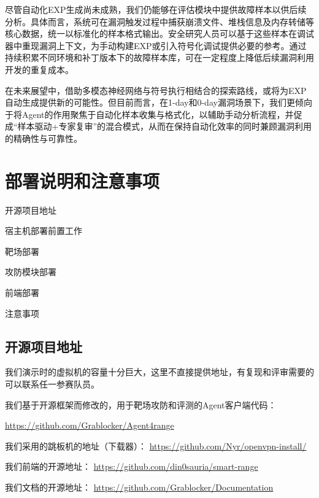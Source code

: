 \documentclass[lang=cn,10pt]{elegantbook}
\begin{document}
尽管自动化EXP生成尚未成熟，我们仍能够在评估模块中提供故障样本以供后续分析。具体而言，系统可在漏洞触发过程中捕获崩溃文件、堆栈信息及内存转储等核心数据，统一以标准化的样本格式输出。安全研究人员可以基于这些样本在调试器中重现漏洞上下文，为手动构建EXP或引入符号化调试提供必要的参考。通过持续积累不同环境和补丁版本下的故障样本库，可在一定程度上降低后续漏洞利用开发的重复成本。

在未来展望中，借助多模态神经网络与符号执行相结合的探索路线，或将为EXP自动生成提供新的可能性。但目前而言，在1-day和0-day漏洞场景下，我们更倾向于将Agent的作用聚焦于自动化样本收集与格式化，以辅助手动分析流程，并促成“样本驱动+专家复审”的混合模式，从而在保持自动化效率的同时兼顾漏洞利用的精确性与可靠性。



\chapter{部署说明和注意事项}
\hypertarget{chap:deploy}{}

\begin{introduction}
    \item 开源项目地址
    \item 宿主机部署前置工作
    \item 靶场部署
    \item 攻防模块部署
    \item 前端部署
    \item 注意事项
\end{introduction}

\section{开源项目地址} 

我们演示时的虚拟机的容量十分巨大，这里不直接提供地址，有复现和评审需要的可以联系任一参赛队员。

我们基于开源框架而修改的，用于靶场攻防和评测的Agent客户端代码：

\href{https://github.com/Grablocker/Agent4range}{https://github.com/Grablocker/Agent4range}

我们采用的跳板机的地址（下载器）：
\href{https://github.com/Nyr/openvpn-install/}{https://github.com/Nyr/openvpn-install/}

我们前端的开源地址：
\href{https://github.com/din0sauria/smart_range}{https://github.com/din0sauria/smart-range}

我们文档的开源地址：
\href{https://github.com/Grablocker/Documentation}{https://github.com/Grablocker/Documentation}
\end{document}
